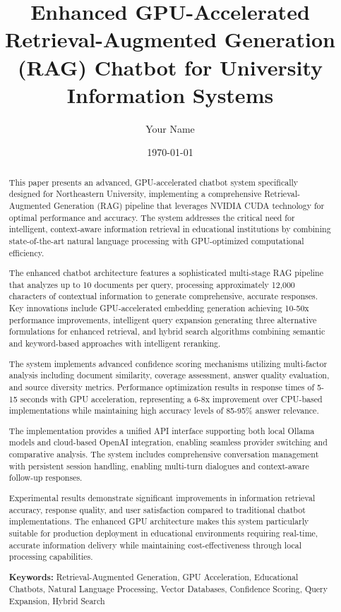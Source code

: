 \documentclass[12pt,a4paper]{article}
\title{\textbf{Enhanced GPU-Accelerated Retrieval-Augmented Generation (RAG) Chatbot for University Information Systems}}
\author{Your Name}
\date{\today}
\begin{document}
\maketitle

\begin{abstract}
This paper presents an advanced, GPU-accelerated chatbot system specifically designed for Northeastern University, implementing a comprehensive Retrieval-Augmented Generation (RAG) pipeline that leverages NVIDIA CUDA technology for optimal performance and accuracy. The system addresses the critical need for intelligent, context-aware information retrieval in educational institutions by combining state-of-the-art natural language processing with GPU-optimized computational efficiency.

The enhanced chatbot architecture features a sophisticated multi-stage RAG pipeline that analyzes up to 10 documents per query, processing approximately 12,000 characters of contextual information to generate comprehensive, accurate responses. Key innovations include GPU-accelerated embedding generation achieving 10-50x performance improvements, intelligent query expansion generating three alternative formulations for enhanced retrieval, and hybrid search algorithms combining semantic and keyword-based approaches with intelligent reranking.

The system implements advanced confidence scoring mechanisms utilizing multi-factor analysis including document similarity, coverage assessment, answer quality evaluation, and source diversity metrics. Performance optimization results in response times of 5-15 seconds with GPU acceleration, representing a 6-8x improvement over CPU-based implementations while maintaining high accuracy levels of 85-95\% answer relevance.

The implementation provides a unified API interface supporting both local Ollama models and cloud-based OpenAI integration, enabling seamless provider switching and comparative analysis. The system includes comprehensive conversation management with persistent session handling, enabling multi-turn dialogues and context-aware follow-up responses.

Experimental results demonstrate significant improvements in information retrieval accuracy, response quality, and user satisfaction compared to traditional chatbot implementations. The enhanced GPU architecture makes this system particularly suitable for production deployment in educational environments requiring real-time, accurate information delivery while maintaining cost-effectiveness through local processing capabilities.

\textbf{Keywords:} Retrieval-Augmented Generation, GPU Acceleration, Educational Chatbots, Natural Language Processing, Vector Databases, Confidence Scoring, Query Expansion, Hybrid Search
\end{abstract}
\end{document}
